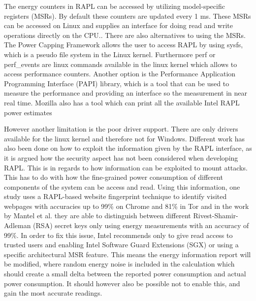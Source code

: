 



The energy counters in RAPL can be accessed by utilizing model-specific registers (MSRs). By default these counters are updated every 1 ms. These MSRs can be accessed on Linux and supplies an interface for doing read and write operations directly on the CPU.\cite{linux_manual_msr}. There are also alternatives to using the MSRs. The Power Capping Framework allows the user to access RAPL by using sysfs, which is a pseudo file system in the Linux kernel\cite{PowerCappingFramework,RAPL_in_action}. Furthermore perf or perf\_events are linux commands available in the linux kernel which allows to access performance counters.\cite{Perf_events,RAPL_in_action} 
Another option is the Performance Application Programming Interface (PAPI) library, which is a tool that can be used to measure the performance and providing an interface so the measurement in near real time\cite{PAPI}.
Mozilla also has a tool which can print all the available Intel RAPL power estimates\cite{FireFox}\nytafsnit





However another limitation is the poor driver support. There are only drivers available for the linux kernel and therefore not for Windows.\cite{RAPL_in_action}  Different work has also been done on how to exploit the information given by the RAPL interface, as it is argued how the security aspect has not been considered when developing RAPL\cite[]{Zhang2021}. This is in regards to how information can be exploited to mount attacks. This has to do with how the fine-grained power consumption of different components of the system can be access and read. Using this information, one study uses a RAPL-based website fingerprint technique to identify visited webpages with accuracies up to 99\% on Chrome and 81\% in Tor\cite[]{Zhang2021} and in the work by Mantel et al.\cite[]{Mantel2018} they are able to distinguish between different Rivest-Shamir-Adleman (RSA) secret keys only using energy measurements with an accuracy of 99\%. In order to fix this issue, Intel recommends only to give read access to trusted users and enabling Intel Software Guard Extensions (SGX) or using a specific architectural MSR feature. This means the energy information report will be modified, where random energy noise is included in the calculation which should create a small delta between the reported power consumption and actual power consumption. It should however also be possible not to enable this, and gain the most accurate readings.\cite[]{intel_rapl_security}

